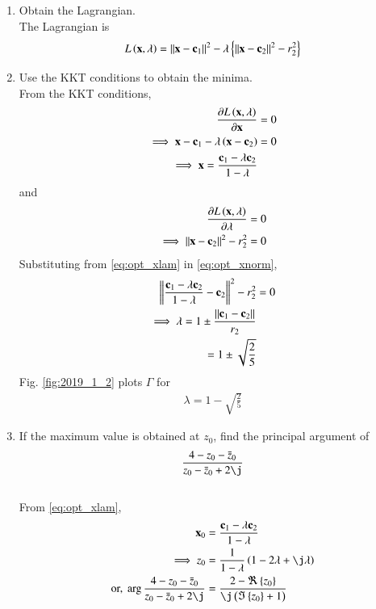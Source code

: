 \documentclass[journal,12pt,twocolumn]{IEEEtran}
\renewcommand\thesection{\arabic{section}}
\begin{document}
\begin{enumerate}[label=\thesection.\arabic*
,ref=\thesection.\theenumi]
\begin{figure}[!ht]
\caption{}
\label{fig:2019_1}
\end{figure}
%
\item Obtain the Lagrangian.
\\
\solution
The Lagrangian is 
\begin{align}
L \left(\mathbf{x},\lambda\right) = \left\Vert\mathbf{x} - \mathbf{c}_1\right\Vert^2 - \lambda 
\left\{\left\Vert\mathbf{x} - \mathbf{c}_2\right\Vert^2-r_2^2\right\}
\end{align}
\item Use the KKT conditions to obtain the minima.
\\
\solution
From the KKT conditions, 
\begin{align}
\frac{\partial L \left(\mathbf{x},\lambda\right)}{\partial \mathbf{x}} &= 0
\\
\implies {\mathbf{x} - \mathbf{c}_1} - \lambda \left(\mathbf{x} - \mathbf{c}_2\right) &= 0
\\
\implies \mathbf{x}  = \frac{\mathbf{c}_1 -\lambda  \mathbf{c}_2}{1-\lambda } &
\label{eq:opt_xlam}
\end{align}
%
and 
\begin{align}
\frac{\partial L \left(\mathbf{x},\lambda\right)}{\partial \lambda} &= 0
\\
\implies \left\Vert\mathbf{x} - \mathbf{c}_2\right\Vert^2-r_2^2 &= 0
\label{eq:opt_xnorm}
\end{align}
Substituting from \eqref{eq:opt_xlam} in \eqref{eq:opt_xnorm},
\begin{align}
\left\Vert\frac{\mathbf{c}_1 -\lambda  \mathbf{c}_2}{1-\lambda } - \mathbf{c}_2\right\Vert^2-r_2^2 &= 0
\\
\implies \lambda = 1\pm \frac{\left\Vert\mathbf{c}_1 - \mathbf{c}_2\right\Vert}{r_2}&
\\
= 1 \pm \sqrt{\frac{2}{5}}
\end{align}
Fig. \ref{fig:2019_1_2} plots $\Gamma$ for 
\begin{align}
\lambda = 1 - \sqrt{\frac{2}{5}}
\end{align}
\item If the maximum value is obtained at $z_0$, find the principal argument of
\begin{align}
\frac{4 - z_0-\bar{z}_0}{z_0-\bar{z}_0+2\j}
\end{align}
\\
\solution 
From \eqref{eq:opt_xlam},
\begin{align}
 \vec{x}_0  &= \frac{\vec{c}_1 -\lambda  \vec{c}_2}{1-\lambda } 
\\
\implies z_0 &= \frac{1}{1-\lambda}\brak{1-2\lambda + \j \lambda }
\\
\text{or, }\arg \frac{4 - z_0-\bar{z}_0}{z_0-\bar{z}_0+2\j} &= \frac{2 - \Re\cbrak{z_0}}{\j\brak{\Im\cbrak{z_0}+1}}

\end{align}
\end{enumerate}
\end{document}
